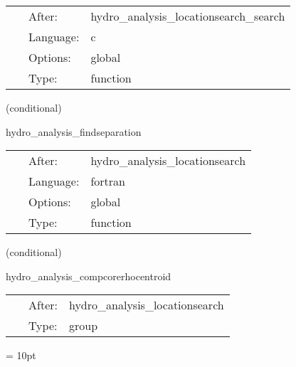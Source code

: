  \begin{tabular*}{160mm}{cll} 
~ & After:  & hydro\_analysis\_locationsearch\_search \\ 
~ & Language:  & c \\ 
~ & Options:  & global \\ 
~ & Type:  & function \\ 
\end{tabular*} 


\vspace{5mm}

   (conditional) 

\hspace{5mm} hydro\_analysis\_findseparation 

\hspace{5mm}{\it compute the proper distance between the maximum of the density and the origin (along a straight coordinate line) } 


\hspace{5mm}

 \begin{tabular*}{160mm}{cll} 
~ & After:  & hydro\_analysis\_locationsearch \\ 
~ & Language:  & fortran \\ 
~ & Options:  & global \\ 
~ & Type:  & function \\ 
\end{tabular*} 


\vspace{5mm}

   (conditional) 

\hspace{5mm} hydro\_analysis\_compcorerhocentroid 

\hspace{5mm}{\it compute center of mass of core region } 


\hspace{5mm}

 \begin{tabular*}{160mm}{cll} 
~ & After:  & hydro\_analysis\_locationsearch \\ 
~ & Type:  & group \\ 
\end{tabular*} 



\vspace{5mm}\parskip = 10pt 

